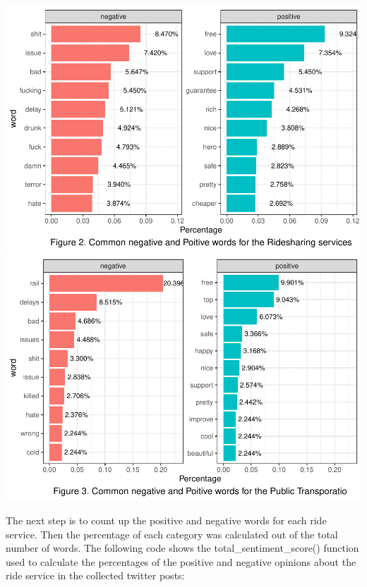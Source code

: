 \documentclass[
  12pt,
]{article}
\begin{document}
\includegraphics{Class_Project_Report_files/figure-latex/unnamed-chunk-13-1.pdf}
\includegraphics{Class_Project_Report_files/figure-latex/unnamed-chunk-13-2.pdf}

The next step is to count up the positive and negative words for each
ride service. Then the percentage of each category was calculated out of
the total number of words. The following code shows the
total\_sentiment\_score() function used to calculate the percentages of
the positive and negative opinions about the ride service in the
collected twitter posts:
\end{document}
